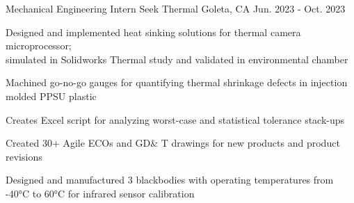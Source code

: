 

\begin{cventries}

\cventry
{Mechanical Engineering Intern} %
{Seek Thermal} %
{Goleta, CA} %
{Jun. 2023 - Oct. 2023} %
{ %
\begin{cvitems}
\item{Designed and implemented heat sinking solutions for thermal camera microprocessor; \\ simulated in Solidworks Thermal study and validated in environmental chamber}
\item{Machined go-no-go gauges for quantifying thermal shrinkage defects in injection molded PPSU plastic}
\item{Creates Excel script for analyzing worst-case and statistical tolerance stack-ups}
\item{Created 30+ Agile ECOs and GD\& T drawings for new products and product revisions}
\item{Designed and manufactured 3 blackbodies with operating temperatures from -40°C to 60°C for infrared sensor calibration}
\end{cvitems}
}


\end{cventries}

